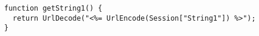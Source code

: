 \begin{lstlisting}[language={[Sharp]C}, caption={ASP.NET WebForm that generates the JavaScript function used in Listing~\ref{code:simple-compiled-rewritten-string}.}, label=code:get-string-one, float]
function getString1() {
  return UrlDecode("<%= UrlEncode(Session["String1"]) %>");
}
\end{lstlisting}

